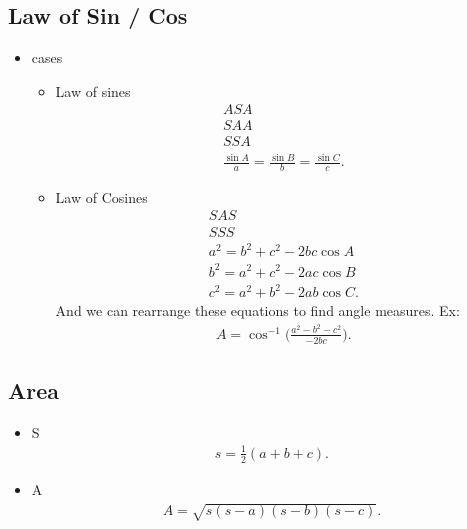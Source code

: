 \documentclass{report}
\begin{document}
     \bigbreak \noindent \bigbreak \noindent 
     \subsection{Law of Sin / Cos}
     \begin{itemize}
       \item cases
         \begin{itemize}
           \item Law of sines
          \begin{align*}
            ASA \\
            SAA \\
            SSA \\
            \frac{\sin{A}}{a} = \frac{\sin{B}}{b} = \frac{\sin{C}}{c}
         .\end{align*}
       \item Law of Cosines
         \begin{align*}
           SAS \\
           SSS \\
           a^{2} = b^{2}+c^{2}-2bc\cos{A} \\
           b^{2} = a^{2}+c^{2}-2ac\cos{B} \\
           c^{2} = a^{2} +b^{2}-2ab\cos{C} 
         .\end{align*}
         And we can rearrange these equations to find angle measures. Ex:
         \begin{align*}
           A = \cos^{-1}\bigg({\frac{a^{2}-b^{2}-c^{2}}{-2bc}}\bigg)
         .\end{align*}
         \end{itemize}
     \end{itemize}

     \bigbreak \noindent \bigbreak \noindent 
     \subsection{Area}
     \begin{itemize}
       \begin{align*}
         A = \frac{1}{2}s_{1}s_{2}\sin{a_{1}}
       .\end{align*}
       \item S
         \begin{align*}
           s = \frac{1}{2}(a+b+c)
         .\end{align*}
        \item A
          \begin{align*}
            A = \sqrt{s(s-a)(s-b)(s-c)}
          .\end{align*}
     \end{itemize}
\end{document}
